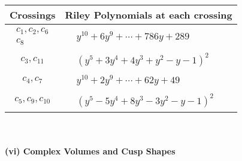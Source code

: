 \documentclass[1p]{elsarticle_modified}
\theoremstyle{definition}
\begin{document}
\begin{tabular}{m{50pt}|m{274pt}}
Crossings & \hspace{64pt}Riley Polynomials at each crossing \\
\hline $$\begin{aligned}c_{1},c_{2},c_{6}\\c_{8}\end{aligned}$$&$\begin{aligned}
&y^{10}+6 y^9+\cdots+786 y+289
\end{aligned}$\\
\hline $$\begin{aligned}c_{3},c_{11}\end{aligned}$$&$\begin{aligned}
&(y^5+3 y^4+4 y^3+y^2- y-1)^2
\end{aligned}$\\
\hline $$\begin{aligned}c_{4},c_{7}\end{aligned}$$&$\begin{aligned}
&y^{10}+2 y^9+\cdots+62 y+49
\end{aligned}$\\
\hline $$\begin{aligned}c_{5},c_{9},c_{10}\end{aligned}$$&$\begin{aligned}
&(y^5-5 y^4+8 y^3-3 y^2- y-1)^2
\end{aligned}$\\
\hline
\end{tabular}\\~\\
\newpage\flushleft \textbf{(vi) Complex Volumes and Cusp Shapes}
\end{document}
